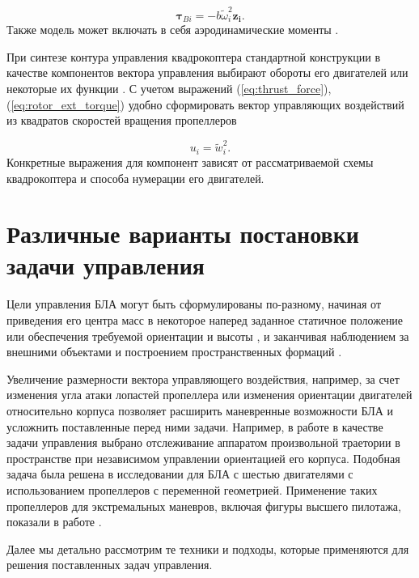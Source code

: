 \begin{equation} \label{eq:rotor_ext_torque}
\bm{\tau}_{Bi} = -b \tilde{\omega}^2_i \bm{z_i}.
\end{equation}
Также модель может включать в себя аэродинамические моменты \cite{Solovev01}.

При синтезе контура управления квадрокоптера стандартной конструкции в качестве компонентов вектора управления выбирают обороты его двигателей или некоторые их функции \cite{Sharifi01, Luukkonen01, Bemporad01}.  С учетом выражений (\ref{eq:thrust_force}), (\ref{eq:rotor_ext_torque}) удобно сформировать вектор управляющих воздействий из квадратов скоростей вращения пропеллеров

\begin{equation} \label{eq:common_control_vector}
u_i = \tilde{w}_i^2.
\end{equation}
Конкретные выражения для компонент зависят от рассматриваемой схемы квадрокоптера и способа нумерации его двигателей.
 
\section{Различные варианты постановки задачи управления}
Цели управления БЛА могут быть сформулированы по-разному,
начиная от приведения его центра масс в некоторое наперед заданное статичное положение
\cite{Huynh01, Yuskin01}
или обеспечения требуемой ориентации и высоты
\cite{Domingos01, Wang01, Gheorghita01, Lukmana01, Zabko01},
и заканчивая наблюдением за внешними объектами
\cite{Rodriguez01, Kendall01, Razinkova01}
и построением пространственных формаций
\cite{Ali01, Zhao01, Preiss01}.
 
Увеличение размерности вектора управляющего воздействия, например, за счет изменения угла атаки лопастей пропеллера \cite{Cutler01, Cutler02}  или изменения ориентации двигателей относительно корпуса \cite{Sridhar02, Kumar02} позволяет расширить маневренные возможности БЛА и усложнить поставленные перед ними задачи. Например, в работе \cite{Ryll02} в качестве задачи управления выбрано отслеживание аппаратом произвольной траетории в пространстве при независимом управлении ориентацией его корпуса. Подобная задача была решена в исследовании \cite{Kaufman01} для БЛА с шестью двигателями с использованием пропеллеров с переменной геометрией. Применение таких пропеллеров для экстремальных маневров, включая фигуры высшего пилотажа, показали в работе \cite{Cutler02}.
 
Далее мы детально рассмотрим те техники и подходы, которые применяются для решения поставленных задач управления. 

